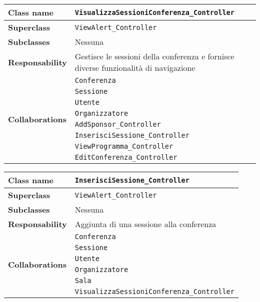 \begin{table}[h!]
	\begin{tabular}{|l|l|}
		\hline 
		\textbf{Class name} & \texttt{VisualizzaSessioniConferenza\_Controller}
		\\ \hline
		\textbf{Superclass} & \texttt{ViewAlert\_Controller}
		\\ \hline
		\multirow{1}{*}{\textbf{Subclasses}} & Nessuna
		\\ \hline
		\textbf{Responsability} & Gestisce le sessioni della conferenza e fornisce diverse funzionalità di navigazione
		\\ \hline
		\multirow{8}{*}{\textbf{Collaborations}} & \texttt{Conferenza} \\
		& \texttt{Sessione}\\
		& \texttt{Utente}\\
		& \texttt{Organizzatore}\\
		& \texttt{AddSponsor\_Controller}\\
		& \texttt{InserisciSessione\_Controller}\\
		& \texttt{ViewProgramma\_Controller}\\
		& \texttt{EditConferenza\_Controller}
		\\ \hline
	\end{tabular}
\end{table}

\begin{table}[h!]
	\begin{tabular}{|l|l|}
		\hline 
		\textbf{Class name} & \texttt{InserisciSessione\_Controller}
		\\ \hline
		\textbf{Superclass} & \texttt{ViewAlert\_Controller}
		\\ \hline
		\multirow{1}{*}{\textbf{Subclasses}} & Nessuna
		\\ \hline
		\textbf{Responsability} & Aggiunta di una sessione alla conferenza
		\\ \hline
		\multirow{6}{*}{\textbf{Collaborations}} & \texttt{Conferenza} \\
		& \texttt{Sessione}\\
		& \texttt{Utente}\\
		& \texttt{Organizzatore}\\
		& \texttt{Sala}\\
		& \texttt{VisualizzaSessioniConferenza\_Controller}		\\ \hline
	\end{tabular}
\end{table}

